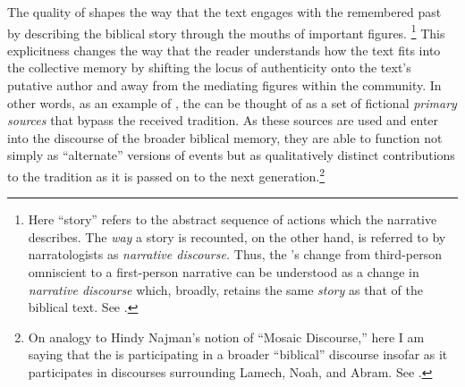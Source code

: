 The \psgraphic quality of \ga shapes the way that the text engages with the remembered past by describing the biblical story through the mouths of important figures.%
%
\footnote{Here ``story'' refers to the abstract sequence of actions which the narrative describes. The \emph{way} a story is recounted, on the other hand, is referred to by narratologists as \emph{narrative discourse.} Thus, the \ga's change from third-person omniscient to a \psgraphical first-person narrative can be understood as a change in \emph{narrative discourse} which, broadly, retains the same \emph{story} as that of the biblical text. See \cite[13--27, esp. 18--19]{abbott2008}.}
%
This explicitness changes the way that the reader understands how the text fits into the collective memory by shifting the locus of authenticity onto the text's putative author and away from the mediating figures within the community. In other words, as an example of \psy, the \ga can be thought of as a set of fictional \emph{primary sources} that bypass the received tradition. As these sources are used and enter into the discourse of the broader biblical memory, they are able to function not simply as ``alternate'' versions of events but as qualitatively distinct contributions to the tradition as it is passed on to the next generation.\footnote{On analogy to Hindy Najman's notion of ``Mosaic Discourse,'' here I am saying that the \ga is participating in a broader ``biblical'' discourse insofar as it participates in discourses surrounding Lamech, Noah, and Abram. See \cite[1--40]{najman2003}.}

